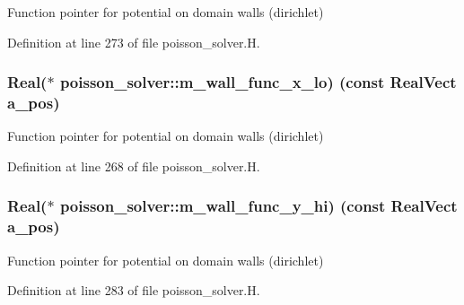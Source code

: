 Function pointer for potential on domain walls (dirichlet) 



Definition at line 273 of file poisson\+\_\+solver.\+H.

\subsubsection[{\texorpdfstring{m\+\_\+wall\+\_\+func\+\_\+x\+\_\+lo}{m_wall_func_x_lo}}]{\setlength{\rightskip}{0pt plus 5cm}Real($\ast$ poisson\+\_\+solver\+::m\+\_\+wall\+\_\+func\+\_\+x\+\_\+lo) (const Real\+Vect a\+\_\+pos)\hspace{0.3cm}{\ttfamily [protected]}}\hypertarget{classpoisson__solver_a11b1782a774d292489353f3dfa7ea8dd}{}\label{classpoisson__solver_a11b1782a774d292489353f3dfa7ea8dd}


Function pointer for potential on domain walls (dirichlet) 



Definition at line 268 of file poisson\+\_\+solver.\+H.

\subsubsection[{\texorpdfstring{m\+\_\+wall\+\_\+func\+\_\+y\+\_\+hi}{m_wall_func_y_hi}}]{\setlength{\rightskip}{0pt plus 5cm}Real($\ast$ poisson\+\_\+solver\+::m\+\_\+wall\+\_\+func\+\_\+y\+\_\+hi) (const Real\+Vect a\+\_\+pos)\hspace{0.3cm}{\ttfamily [protected]}}\hypertarget{classpoisson__solver_ae468dab3917bfc3765d2b961c2f3953c}{}\label{classpoisson__solver_ae468dab3917bfc3765d2b961c2f3953c}


Function pointer for potential on domain walls (dirichlet) 



Definition at line 283 of file poisson\+\_\+solver.\+H.

